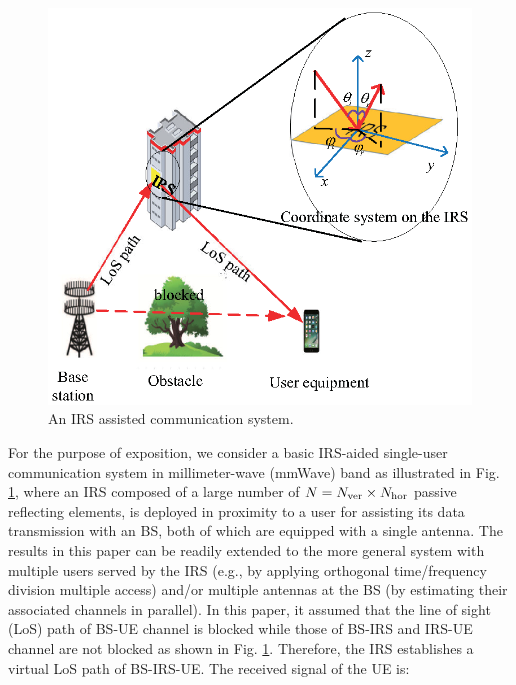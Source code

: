 \documentclass[12pt,draftclsnofoot,onecolumn]{IEEEtran}
\begin{document}
	\begin{figure}
		\centering
		\includegraphics[scale=1]{IRS_scenario.eps}
		\caption{ An IRS assisted communication system.}     \label{cascaded channel}
	\end{figure}
	For the purpose of exposition, we consider a basic IRS-aided  single-user communication system in millimeter-wave (mmWave) band  as illustrated in Fig. \ref{cascaded channel}, where an IRS composed of a large number of $N=N_{\rm ver} \times N_{\rm hor}$ passive reflecting elements, is deployed in proximity to a user for assisting its data transmission with an BS, both of which are equipped with a single antenna. The results in this paper can be readily extended to the more general system with multiple users served by the IRS (e.g., by applying orthogonal time/frequency division multiple access) and/or multiple antennas at the BS (by estimating their associated channels in parallel). In this paper, it assumed that the line of sight (LoS) path of BS-UE channel is blocked while those of BS-IRS and IRS-UE channel are not blocked as shown in Fig. \ref{cascaded channel}. Therefore, the IRS establishes a virtual LoS path of BS-IRS-UE. The received signal of the UE is:
\end{document}
